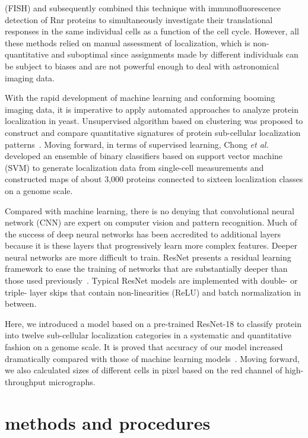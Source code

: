 \documentclass[12pt]{article}
\begin{document}
(FISH) and subsequently combined this technique with
immunofluorescence detection of Rnr proteins to simultaneously
investigate their translational responses in the same individual
cells as a function of the cell cycle. However, all these methods relied on manual assessment of localization, which is non-quantitative and suboptimal since assignments made by different individuals can be subject to biases and are not powerful enough to deal with astronomical imaging data.
\par With the rapid development of machine learning and conforming booming imaging data, it is imperative to apply automated approaches to analyze protein localization in yeast. Unsupervised algorithm based on clustering was proposed to construct and compare quantitative signatures of protein sub-cellular localization patterns~\cite{loo2014quantitative}. Moving forward, in terms of supervised learning, Chong \textit{et al.}~\cite{chong2015yeast} developed an ensemble of binary classifiers based on support vector machine (SVM) to generate localization data from single-cell measurements and constructed maps of about 3,000 proteins connected to sixteen localization classes on a genome scale.
\par Compared with machine learning, there is no denying that convolutional neural network (CNN) are expert on computer vision and pattern recognition. Much of the success of deep neural networks has been accredited to additional layers because it is these layers that progressively learn more complex features. Deeper neural networks are more difficult to train. ResNet presents a residual learning framework to ease the training of networks that are substantially deeper than those used
previously~\cite{he2016deep}. Typical ResNet models are implemented with double- or triple- layer skips that contain non-linearities (ReLU) and batch normalization in between.
\par Here, we introduced a model based on a pre-trained ResNet-18 to classify protein into twelve sub-cellular localization categories in a systematic and quantitative fashion on a genome scale. It is proved that accuracy of our model increased dramatically compared with those of machine learning models~\cite{chong2015yeast}. Moving forward, we also calculated sizes of different cells in pixel based on the red channel of high-throughput micrographs.

\section*{methods and procedures}
\end{document}
